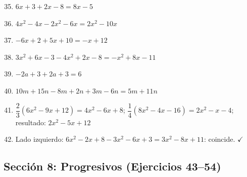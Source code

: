 \documentclass[12pt, letterpaper]{article}
\begin{document}
  \begin{enumerate}[leftmargin=*, label=\textbf{\arabic*.}]
    \setcounter{enumi}{34}
    \item $6x + 3 + 2x - 8 = 8x - 5$

    \item $4x^2 - 4x - 2x^2 - 6x = 2x^2 - 10x$

    \item $-6x + 2 + 5x + 10 = -x + 12$

    \item $3x^2 + 6x - 3 - 4x^2 + 2x - 8 = -x^2 + 8x - 11$

    \item $-2a + 3 + 2a + 3 = 6$

    \item $10m + 15n - 8m + 2n + 3m - 6n = 5m + 11n$

    \item $\dfrac{2}{3}(6x^2 - 9x + 12) = 4x^2 - 6x + 8$; $\dfrac{1}{4}(8x^2 - 4x - 16) = 2x^2 - x - 4$; resultado: $2x^2 - 5x + 12$

    \item Lado izquierdo: $6x^2 - 2x + 8 - 3x^2 - 6x + 3 = 3x^2 - 8x + 11$: coincide. $\checkmark$
  \end{enumerate}

  \newpage

  \subsection*{Sección 8: Progresivos (Ejercicios 43--54)}
\end{document}

